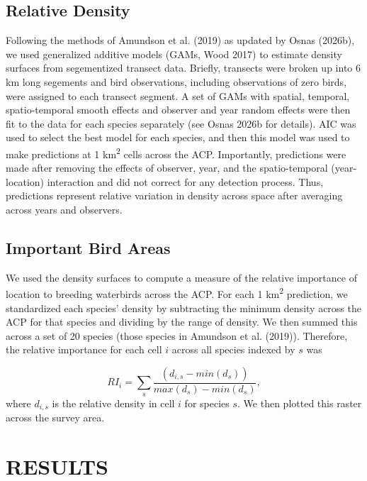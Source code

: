 \documentclass[
]{article}
\begin{document}
\subsection*{Relative Density}\label{relative-density}

Following the methods of Amundson et al. (2019) as updated by Osnas
(2026b), we used generalized additive models (GAMs, Wood 2017) to
estimate density surfaces from segementized transect data. Briefly,
transects were broken up into 6 km long segements and bird observations,
including observations of zero birds, were assigned to each transect
segment. A set of GAMs with spatial, temporal, spatio-temporal smooth
effects and observer and year random effects were then fit to the data
for each species separately (see Osnas 2026b for details). AIC was used
to select the best model for each species, and then this model was used
to make predictions at 1 km\textsuperscript{2} cells across the ACP.
Importantly, predictions were made after removing the effects of
observer, year, and the spatio-temporal (year-location) interaction and
did not correct for any detection process. Thus, predictions represent
relative variation in density across space after averaging across years
and observers.

\subsection*{Important Bird Areas}\label{important-bird-areas}

We used the density surfaces to compute a measure of the relative
importance of location to breeding waterbirds across the ACP. For each 1
km\textsuperscript{2} prediction, we standardized each species' density
by subtracting the minimum density across the ACP for that species and
dividing by the range of density. We then summed this across a set of 20
species (those species in Amundson et al. (2019)). Therefore, the
relative importance for each cell \(i\) across all species indexed by
\(s\) was

\[RI_i = \sum_s \frac{(d_{i,s} - min(d_s))}{max(d_s)-min(d_s)},\] where
\(d_{i,s}\) is the relative density in cell \(i\) for species \(s\). We
then plotted this raster across the survey area.

\section*{RESULTS}\label{results}
\end{document}
